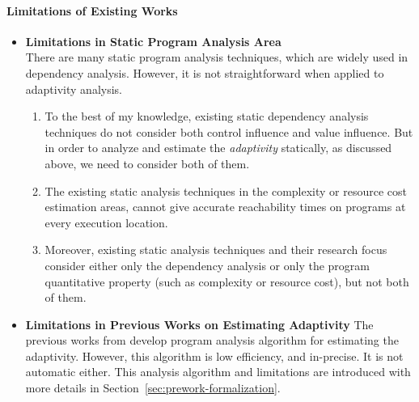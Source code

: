 \paragraph{Limitations of Existing Works}
\begin{itemize}
 \item \textbf{Limitations in Static Program Analysis Area}
 \\
 There are many static program analysis techniques, which are widely used in dependency analysis. 
 However, it is not straightforward when applied to adaptivity analysis.
 \begin{enumerate}
 \item To the best of my knowledge,
 existing static dependency analysis techniques do not consider both control influence and value influence.
 But in order to analyze and estimate the \emph{adaptivity} statically, as discussed above, we need to consider both of them.
 \item The existing static analysis techniques in the complexity or resource cost estimation areas,
 cannot give accurate reachability times on programs 
 at every execution location.
 \item Moreover, existing static analysis techniques and their research focus consider
 either only the dependency analysis
 or only the program quantitative property (such as complexity or resource cost),
 but not both of them.
 \end{enumerate}
\item \textbf{Limitations in Previous Works on Estimating Adaptivity}
The previous works from \cite{weihao22}
develop program analysis algorithm for estimating the adaptivity.
However, this algorithm is low efficiency, and in-precise. It is not automatic either. 
This analysis algorithm and limitations are introduced with more details in Section~\ref{sec:prework-formalization}.
\end{itemize}


